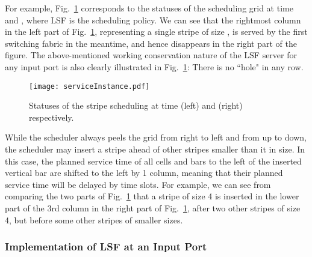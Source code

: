 For example, Fig.~\ref{fig: instance}
corresponds to the statuses of the scheduling grid at time  and , 
where LSF is the scheduling policy.  We can see that
the rightmost
column 
in the left part of Fig.~\ref{fig: instance}, representing a single stripe of size , 
is served by the first switching fabric in the meantime, 
and hence disappears in the right part of the figure.  
The above-mentioned working conservation nature of the LSF server for any input port is
also clearly illustrated in Fig.~\ref{fig: instance}:  
There is no ``hole" in any row.  

\begin{figure}[htb]
  \centering
    \texttt{[image: serviceInstance.pdf]}
    \caption{Statuses of the stripe scheduling at time  (left) and  (right) respectively.}
\label{fig: instance}
\end{figure}	 














While the scheduler always peels the grid from right to left and from up to down, 
the scheduler may insert a stripe ahead of other stripes smaller than it in size.  
In this case, the planned service time of all cells and bars to the left of the inserted vertical bar 
are shifted to the left by 1 column, meaning that their planned service time will 
be delayed by  time slots.
For example, we 
can see from comparing the two parts of Fig.~\ref{fig: instance}
that a stripe of size 4 is inserted in the lower part of the 
3rd column in the right part of Fig.~\ref{fig: instance}, 
after two other stripes of size 4, but before some other stripes of smaller sizes.




















\subsubsection{Implementation of LSF at an Input Port}
\label{subsec:data strucutre lsf}

